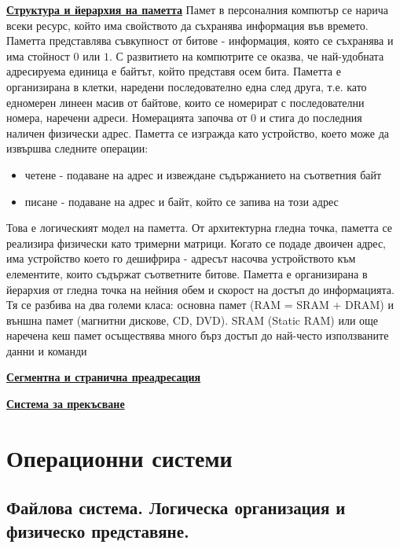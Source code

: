 \documentclass{article}
\begin{document}
\textbf{\underline{Структура и йерархия на паметта}} \newline\newline
Памет в персоналния компютър се нарича всеки ресурс, който има свойството да съхранява информация във времето. Паметта представлява
съвкупност от битове - информация, която се съхранява и има стойност $0$ или $1$. С развитието на компютрите се оказва, че
най-удобната адресируема единица е байтът, който представя осем бита. Паметта е организирана в клетки, наредени последователно
една след друга, т.е. като едномерен линеен масив от байтове, които се номерират с последователни номера, наречени адреси.
Номерацията започва от 0 и стига до последния наличен физически адрес. Паметта се изгражда като устройство, което може да извършва
следните операции:
\begin{itemize}
    \item четене - подаване на адрес и извеждане съдържанието на съответния байт
    \item писане - подаване на адрес и байт, който се запива на този адрес
\end{itemize}
Това е логическият модел на паметта. От архитектурна гледна точка, паметта се реализира физически като тримерни матрици. Когато
се подаде двоичен адрес, има устройство което го дешифрира - адресът насочва устройството към елементите, които съдържат съответните
битове.
Паметта е организирана в йерархия от гледна точка на нейния обем и скорост на достъп до информацията. Тя се разбива на два
големи класа: основна памет (RAM = SRAM + DRAM) и външна памет (магнитни дискове, CD, DVD).
SRAM (Static RAM) или още наречена кеш памет осъществява много бърз достъп до най-често използваните данни и команди

\textbf{\underline{Сегментна и странична преадресация}} \newline\newline



\textbf{\underline{Система за прекъсване}} \newline\newline

\section*{Операционни системи}

\subsection*{Файлова система. Логическа организация и физическо представяне.}
\end{document}
